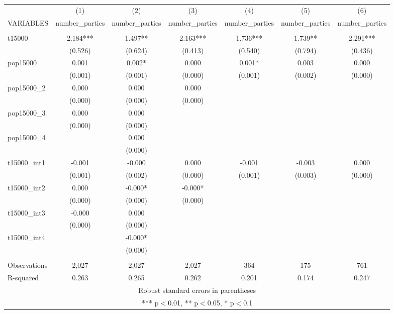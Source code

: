 \documentclass[]{article}
\begin{document}
\begin{tabular}{lcccccc} \hline
 & (1) & (2) & (3) & (4) & (5) & (6) \\
VARIABLES & number\_parties & number\_parties & number\_parties & number\_parties & number\_parties & number\_parties \\ \hline
 &  &  &  &  &  &  \\
t15000 & 2.184*** & 1.497** & 2.163*** & 1.736*** & 1.739** & 2.291*** \\
 & (0.526) & (0.624) & (0.413) & (0.540) & (0.794) & (0.436) \\
pop15000 & 0.001 & 0.002* & 0.000 & 0.001* & 0.003 & 0.000 \\
 & (0.001) & (0.001) & (0.000) & (0.001) & (0.002) & (0.000) \\
pop15000\_2 & 0.000 & 0.000 & 0.000 &  &  &  \\
 & (0.000) & (0.000) & (0.000) &  &  &  \\
pop15000\_3 & 0.000 & 0.000 &  &  &  &  \\
 & (0.000) & (0.000) &  &  &  &  \\
pop15000\_4 &  & 0.000 &  &  &  &  \\
 &  & (0.000) &  &  &  &  \\
t15000\_int1 & -0.001 & -0.000 & 0.000 & -0.001 & -0.003 & 0.000 \\
 & (0.001) & (0.002) & (0.000) & (0.001) & (0.003) & (0.000) \\
t15000\_int2 & 0.000 & -0.000* & -0.000* &  &  &  \\
 & (0.000) & (0.000) & (0.000) &  &  &  \\
t15000\_int3 & -0.000 & 0.000 &  &  &  &  \\
 & (0.000) & (0.000) &  &  &  &  \\
t15000\_int4 &  & -0.000* &  &  &  &  \\
 &  & (0.000) &  &  &  &  \\
 &  &  &  &  &  &  \\
Observations & 2,027 & 2,027 & 2,027 & 364 & 175 & 761 \\
 R-squared & 0.263 & 0.265 & 0.262 & 0.201 & 0.174 & 0.247 \\ \hline
\multicolumn{7}{c}{ Robust standard errors in parentheses} \\
\multicolumn{7}{c}{ *** p$<$0.01, ** p$<$0.05, * p$<$0.1} \\
\end{tabular}
\end{document}
